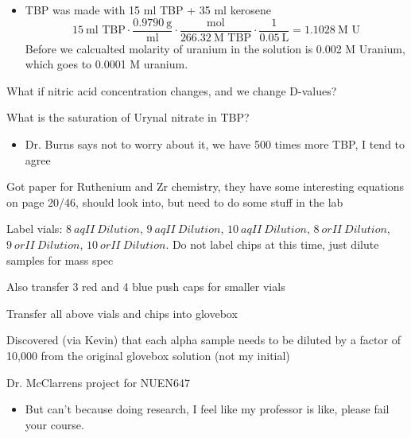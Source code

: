 \documentclass[idxtotoc,hyperref,openany,oneside]{labbook} %
\newcommand{\cmark}{\ding{51}}%
\newcommand{\done}{\rlap{$\square$}{\raisebox{2pt}{\large\hspace{1pt}\cmark}}%
  \hspace{-2.5pt}}
\begin{document}
\begin{todolist}
\begin{todolist}
\begin{itemize}
    \item{TBP was made with 15 ml TBP + 35 ml kerosene}
      \begin{equation*}
        15\ \text{ml TBP}\cdot\frac{0.9790\ \text{g}}{\text{ml}}
        \cdot\frac{\text{mol}}{266.32\ \text{M TBP}}\cdot
        \frac{1}{0.05\ \text{L}}=1.1028\ \text{M U}
      \end{equation*}
      Before we calcualted molarity of uranium in the solution is
      0.002 M Uranium, which goes to 0.0001 M uranium.
    \end{itemize}
  \end{todolist}
\item{What if nitric acid concentration changes, and we change D-values?}
\item{What is the saturation of Urynal nitrate in TBP?}
  \begin{itemize}
  \item{Dr. Burns says not to worry about it, we have 500 times more
    TBP, I tend to agree}
  \end{itemize}
\item{Got paper for Ruthenium and Zr chemistry, they have
  some interesting equations on page 20/46, should look into,
  but need to do some stuff in the lab}
\end{todolist}


\begin{todolist}
\item[\done]{Label vials:
  $\boxed{8\ aqII\ Dilution}$,
  $\boxed{9\ aqII\ Dilution}$,
  $\boxed{10\ aqII\ Dilution}$,
  $\boxed{8\ orII\ Dilution}$,
  $\boxed{9\ orII\ Dilution}$,
  $\boxed{10\ orII\ Dilution}$.
  Do not label chips at this time, just dilute samples
  for mass spec}
\item[\done]{Also transfer 3 red and 4 blue push caps for smaller vials}
\item[\done]{Transfer all above vials and chips into glovebox}
\item[\done]{Discovered (via Kevin) that each alpha sample
  needs to be diluted by a factor of 10,000 from the
  original glovebox solution (not my initial)}
\end{todolist}  


\begin{todolist}
\item{Dr. McClarrens project for NUEN647}
  \begin{itemize}
  \item{But can't because doing research, I feel like
  my professor is like, please fail your course.}
  \end{itemize}
\end{todolist}
\end{document}

